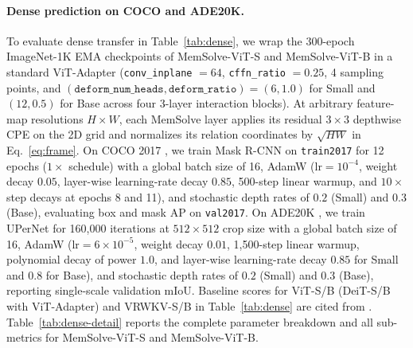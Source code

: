 \documentclass[10pt,twocolumn]{article}
\begin{document}
\paragraph{Dense prediction on COCO and ADE20K.}
\label{app:dense}
To evaluate dense transfer in Table~\ref{tab:dense}, we wrap the 300-epoch
ImageNet-1K EMA checkpoints of MemSolve-ViT-S and MemSolve-ViT-B in a standard
ViT-Adapter \cite{chen2023vitadapter,duan2025vrwkv} (\texttt{conv\_inplane}
$=64$, \texttt{cffn\_ratio} $=0.25$, 4 sampling points, and
$(\texttt{deform\_num\_heads},\texttt{deform\_ratio})=(6,1.0)$ for Small and
$(12,0.5)$ for Base across four 3-layer interaction blocks).
At arbitrary feature-map resolutions $H\times W$, each MemSolve layer applies
its residual $3\times3$ depthwise CPE on the 2D grid and normalizes its
relation coordinates by $\sqrt{HW}$ in Eq.~\eqref{eq:frame}.
On COCO 2017 \cite{lin2014coco}, we train Mask R-CNN \cite{he2017maskrcnn} on
\texttt{train2017} for 12 epochs ($1\times$ schedule) with a global batch size
of 16, AdamW ($\text{lr}=10^{-4}$, weight decay $0.05$, layer-wise
learning-rate decay $0.85$, 500-step linear warmup, and $10\times$ step decays
at epochs 8 and 11), and stochastic depth rates of $0.2$ (Small) and $0.3$
(Base), evaluating box and mask AP on \texttt{val2017}.
On ADE20K \cite{zhou2017ade20k}, we train UPerNet \cite{xiao2018upernet} for
160,000 iterations at $512\times512$ crop size with a global batch size of 16,
AdamW ($\text{lr}=6\times10^{-5}$, weight decay $0.01$, 1,500-step linear
warmup, polynomial decay of power $1.0$, and layer-wise learning-rate decay
$0.85$ for Small and $0.8$ for Base), and stochastic depth rates of $0.2$
(Small) and $0.3$ (Base), reporting single-scale validation mIoU.
Baseline scores for ViT-S/B (DeiT-S/B with ViT-Adapter) and VRWKV-S/B in
Table~\ref{tab:dense} are cited from \cite{chen2023vitadapter,duan2025vrwkv}.
Table~\ref{tab:dense-detail} reports the complete parameter breakdown and all
sub-metrics for MemSolve-ViT-S and MemSolve-ViT-B.
\end{document}
